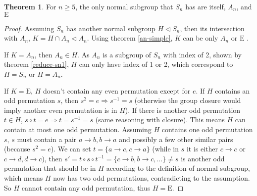 \documentclass[]{article}
\theoremstyle{definition}\newtheorem{theorem}{Theorem}
\begin{document}
\begin{theorem}
	\label{reduce-sn2}
	For $n \ge 5$, the only normal subgroup that $S_n$ has are itself, $A_n$, and $\mathrm{E}$
\end{theorem}
\begin{proof}
	Assuming $S_n$ has another normal subgroup $H \triangleleft S_n$, then its intersection with $A_n$, $K = H \cap A_n \triangleleft A_n$. Using theorem \ref{an-simple}, $K$ can be only $A_n$ or $\mathrm{E}$ .
	
	If $K = A_n$, then $A_n \in H$. As $A_n$ is a subgroup of $S_n$ with index of 2, shown by theorem \ref{reduce-sn1}, $H$ can only have index of 1 or 2, which correspond to $H = S_n$ or $H = A_n$.
	
	If $K = \mathrm{E}$, $H$ doesn't contain any even permutation except for $e$. If $H$ contains an odd permutation $s$, then $s^2 = e \Rightarrow s^{-1} = s$ (otherwise the group closure would imply another even permutation is in $H$). If there is another odd permutation $t\in H$, $s\circ t= e \Rightarrow t = s^{-1} = s$ (same reasoning with closure). This means $H$ can contain at most one odd permutation. Assuming $H$ contains one odd permutation $s$, $s$ must contain a pair $a\rightarrow b, b\rightarrow a$ and possibly a few other similar pairs (because $s^2=e$). We can set $t = \{a\rightarrow c, c\rightarrow a\}$ (while in $s$ it is either $c\rightarrow c$ or $c\rightarrow d,d \rightarrow c$), then $s'=t\circ s\circ t^{-1} = \{c\rightarrow b, b\rightarrow c,\dots\}\neq s$ is another odd permutation that should be in $H$ according to the definition of normal subgroup, which means $H$ now has two odd permutations, contradicting to the assumption. So $H$ cannot contain any odd permutation, thus $H = \mathrm{E}$.
\end{proof}
\end{document}
